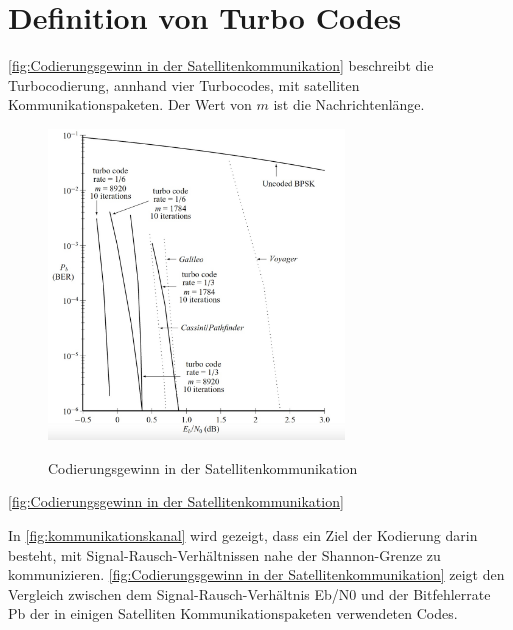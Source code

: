 \chapter{Definition von Turbo Codes}

\autoref{fig:Codierungsgewinn in der Satellitenkommunikation} beschreibt die Turbocodierung, annhand vier Turbocodes, mit  satelliten Kommunikationspaketen. Der Wert von \(m\) ist die Nachrichtenlänge.\cite[S. 7]{huffman}

\begin{figure}[!ht]
    \centering
     {\includegraphics[width=0.7\textwidth]{./pic/Codierungsgewinn in der Satellitenkommunikation}}
    \caption{ Codierungsgewinn in der Satellitenkommunikation}
    \label{fig:Codierungsgewinn in der Satellitenkommunikation}
\end{figure} 
\autoref{fig:Codierungsgewinn in der Satellitenkommunikation}

In \autoref{fig:kommunikationskanal}
wird gezeigt, 
dass ein Ziel der Kodierung darin besteht, mit Signal-Rausch-Verhältnissen nahe der 
Shannon-Grenze zu kommunizieren. 
\autoref{fig:Codierungsgewinn in der Satellitenkommunikation}
zeigt den Vergleich zwischen dem Signal-Rausch-Verhältnis 
Eb/N0 und der Bitfehlerrate Pb der in einigen Satelliten Kommunikationspaketen 
verwendeten Codes.
\pagebreak

